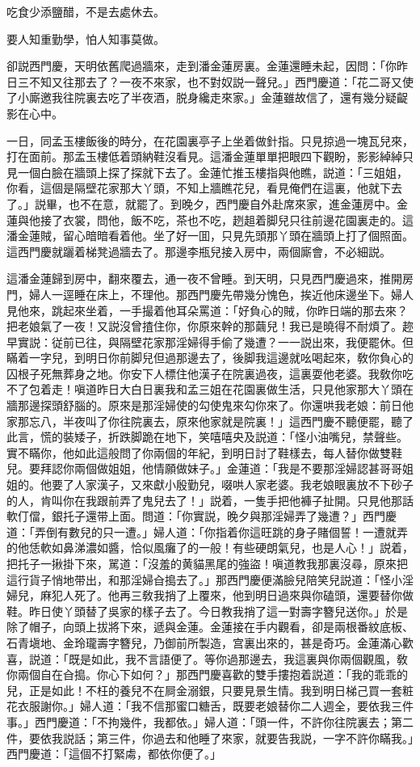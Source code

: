 \begin{myquote}
吃食少添鹽醋，不是去處休去。

要人知重勤學，怕人知事莫做。
\end{myquote}

卻説西門慶，天明依舊爬過牆來，走到潘金蓮房裏。金蓮還睡未起，因問：「你昨日三不知又往那去了？一夜不來家，也不對奴説一聲兒。」西門慶道：「花二哥又使了小廝邀我往院裏去吃了半夜酒，脱身纔走來家。」金蓮雖故信了，還有幾分疑齪影在心中。

一日，同孟玉樓飯後的時分，在花園裏亭子上坐着做針指。只見掠過一塊瓦兒來，打在面前。那孟玉樓低着頭納鞋沒看見。這潘金蓮單單把眼四下觀盼，影影綽綽只見一個白臉在牆頭上探了探就下去了。金蓮忙推玉樓指與他瞧，説道：「三姐姐，你看，這個是隔壁花家那大丫頭，不知上牆瞧花兒，看見俺們在這裏，他就下去了。」説畢，也不在意，就罷了。到晚夕，西門慶自外赴席來家，進金蓮房中。金蓮與他接了衣裳，問他，飯不吃，茶也不吃，趔趄着脚兒只往前邊花園裏走的。這潘金蓮賊，留心暗暗看着他。坐了好一囬，只見先頭那丫頭在牆頭上打了個照面。這西門慶就躧着梯凳過牆去了。那邊李瓶兒接入房中，兩個廝會，不必細説。

這潘金蓮歸到房中，翻來覆去，通一夜不曾睡。到天明，只見西門慶過來，推開房門，婦人一逕睡在床上，不理他。那西門慶先帶幾分愧色，挨近他床邊坐下。婦人見他來，跳起來坐着，一手撮着他耳朵罵道：「好負心的賊，你昨日端的那去來？把老娘氣了一夜！又説沒曾揸住你，你原來幹的那繭兒！我已是曉得不耐煩了。趂早實説：従前已往，與隔壁花家那淫婦得手偷了幾遭？一一説出來，我便罷休。但瞞着一字兒，到明日你前脚兒但過那邊去了，後脚我這邊就吆喝起來，敎你負心的囚根子死無葬身之地。你安下人標住他漢子在院裏過夜，這裏耍他老婆。我敎你吃不了包着走！嗔道昨日大白日裏我和孟三姐在花園裏做生活，只見他家那大丫頭在牆那邊探頭舒腦的。原來是那淫婦使的勾使鬼來勾你來了。你還哄我老娘：前日他家那忘八，半夜叫了你往院裏去，原來他家就是院裏！」這西門慶不聽便罷，聽了此言，慌的裝矮子，折跌脚跪在地下，笑嘻嘻央及説道：「怪小油嘴兒，禁聲些。實不瞞你，他如此這般問了你兩個的年紀，到明日討了鞋樣去，每人替你做雙鞋兒。要拜認你兩個做姐姐，他情願做妹子。」金蓮道：「我是不要那淫婦認甚哥哥姐姐的。他要了人家漢子，又來獻小殷勤兒，啜哄人家老婆。我老娘眼裏放不下砂子的人，肯叫你在我跟前弄了鬼兒去了！」説着，一隻手把他褲子扯開。只見他那話軟仃儅，銀托子還带上面。問道：「你實説，晚夕與那淫婦弄了幾遭？」西門慶道：「弄倒有數兒的只一遭。」婦人道：「你指着你這旺跳的身子賭個誓！一遭就弄的他恁軟如鼻涕濃如醬，恰似風癱了的一般！有些硬朗氣兒，也是人心！」説着，把托子一揪掛下來，駡道：「沒羞的黄貓黑尾的強盜！嗔道教我那裏沒尋，原來把這行貨子悄地带出，和那淫婦㒲搗去了。」那西門慶便滿臉兒陪笑兒説道：「怪小淫婦兒，麻犯人死了。他再三敎我捎了上覆來，他到明日過來與你磕頭，還要替你做鞋。昨日使丫頭替了吳家的樣子去了。今日教我捎了這一對壽字簪兒送你。」於是除了帽子，向頭上拔將下來，遞與金蓮。金蓮接在手内觀看，卻是兩根番紋底板、石青塡地、金玲瓏壽字簪兒，乃御前所製造，宫裏出來的，甚是奇巧。金蓮滿心歡喜，説道：「既是如此，我不言語便了。等你過那邊去，我這裏與你兩個觀風，敎你兩個自在㒲搗。你心下如何？」那西門慶喜歡的雙手摟抱着説道：「我的乖乖的兒，正是如此！不枉的養兒不在屙金溺銀，只要見景生情。我到明日梯己買一套粧花衣服謝你。」婦人道：「我不信那蜜口糖舌，既要老娘替你二人週全，要依我三件事。」西門慶道：「不拘幾件，我都依。」婦人道：「頭一件，不許你往院裏去；第二件，要依我説話；第三件，你過去和他睡了來家，就要告我説，一字不許你瞞我。」西門慶道：「這個不打緊䖏，都依你便了。」

